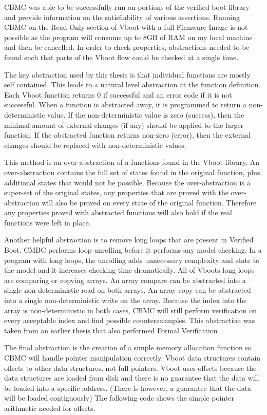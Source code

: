 CBMC was able to be successfully run on portions of the verified boot library and provide information on the satisfiability of various assertions.
Running CBMC on the Read-Only section of Vboot with a full Firmware Image is not possible as the program will consume up to 8GB of RAM on my local machine and then be cancelled.
In order to check properties, abstractions needed to be found such that parts of the Vboot flow could be checked at a single time.

The key abstraction used by this thesis is that individual functions are mostly
self contained.
This leads to a natural level abstraction at the function definition.
Each Vboot function returns 0 if successful and an error code if it is not successful.
When a function is abstracted away, it is programmed to return a
non-deterministic value.
If the non-deterministic value is zero (success), then the minimal amount of external changes (if any) should be applied to the larger function.
If the abstracted function returns non-zero (error), then the external changes should be replaced with non-deterministic values.

This method is an over-abstraction of a functions found in the Vboot library.
An over-abstraction contains the full set of states found in the original function, plus additional states that would not be possible.
Because the over-abstraction is a super-set of the original states, any properties that are proved with the over-abstraction will also be proved on every state of the original function.
Therefore any properties proved with abstracted functions will also hold if the real functions were left in place.

Another helpful abstraction is to remove long loops that are present in Verified
Boot.
CMBC performs loop unrolling before it performs any model checking. 
In a program with long loops, the unrolling adds unnecessary complexity and
state to the model and it increases checking time dramatically.
All of Vboots long loops are comparing or copying arrays.
An array compare can be abstracted into a single non-deterministic read on both
arrays.
An array copy can be abstracted into a single non-deterministic write on the
array.
Because the index into the array is non-deterministic in both cases, CBMC will
still perform verification on every acceptable index and find possible
counterexamples.
This abstraction was taken from an earlier thesis that also performed Formal
Verification~\cite{elane}. 

The final abstraction is the creation of a simple memory allocation function so
CBMC will handle pointer manipulation correctly.
Vboot data structures contain offsets to other data structures, not full
pointers. 
Vboot uses offsets because the data structures are loaded from disk and there is
no guarantee that the data will be loaded into a specific address.
(There is however, a guarantee that the data will be loaded contiguously)
The following code shows the simple pointer arithmetic needed for offsets.

